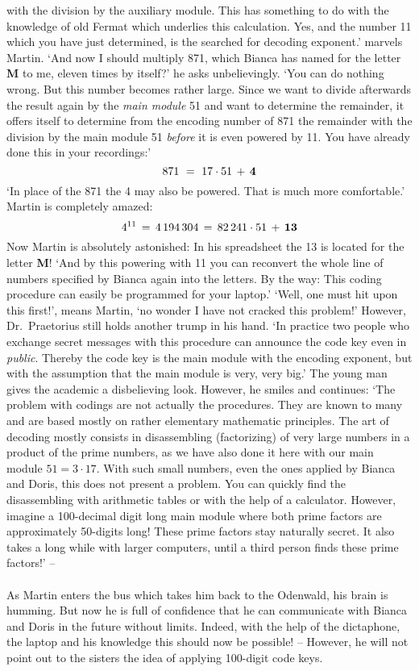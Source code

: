 with the division by the auxiliary module. 
This has something to do with the knowledge of old Fermat which underlies this calculation. 
Yes, and the number 11 which you have just determined, is the searched for decoding exponent.' marvels Martin. 
`And now I should multiply 871, which Bianca has named for the letter {\bf M} to me, eleven times by 
itself?' he asks unbelievingly.
`You can do nothing wrong. 
But this number becomes rather large. 
Since we want to divide afterwards the result again by the {\em main module \/} 51 and want to determine 
the remainder, it offers itself to determine from the encoding number of 871 the remainder with the division 
by the main module 51 {\em before \/} it is even powered by 11. 
You have already done this in your recordings:' 
\[
871\, \, =\, \, 17\cdot 51\, +\, {\bf 4} 
\] 
`In place of the 871 the 4 may also be powered. 
That is much more comfortable.' Martin is completely amazed: 
\[
4^{11}\, =\, 4\,194\,304\, =\, 82\,241\cdot 51\, +\, {\bf 13} 
\] 
Now Martin is absolutely astonished: In his spreadsheet the 13 is located for the letter {\bf M}! 
`And by this powering with 11 you can reconvert the whole line of numbers specified by Bianca again into the letters. 
By the way: This coding procedure can easily be programmed for your laptop.' 
`Well, one must hit upon this first!', means Martin, `no wonder I have not cracked this problem!' 
However, Dr.~Praetorius still holds another trump in his hand. 
`In practice two people who exchange secret messages with this procedure can announce the code key even in 
{\em public\/}. 
Thereby the code key is the main module with the encoding exponent, but with the assumption that the main 
module is very, very big.'
The young man gives the academic a disbelieving look. 
However, he smiles and continues: 
`The problem with codings are not actually the procedures. 
They are known to many and are based mostly on rather elementary mathematic principles. 
The art of decoding mostly consists in disassembling (factorizing) of very large numbers in a product of 
the prime numbers, as we have also done it here with our main module \(51=3\cdot 17 \). 
With such small numbers, even the ones applied by Bianca and Doris, this does not present a problem.
You can quickly find the disassembling with arithmetic tables or with the help of a calculator. 
However, imagine a 100-decimal digit long main module where both prime factors are approximately 50-digits long! 
These prime factors stay naturally secret. 
It also takes a long while with larger computers, until a third person finds these prime factors!' -- \\ \\ 
As Martin enters the bus which takes him back to the Odenwald, his brain is humming.
But now he is full of confidence that he can communicate with Bianca and Doris in the future without limits. 
Indeed, with the help of the dictaphone, the laptop and his knowledge this should now be possible! 
-- However, he will not point out to the sisters the idea of applying 100-digit code keys.

